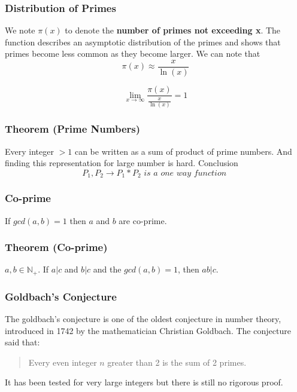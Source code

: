 \documentclass{article}
\begin{document}
\subsubsection{Distribution of Primes} We note $ \pi(x) $ to denote the \textbf{number of primes not exceeding x}. The function describes an asymptotic distribution of the primes and shows that primes become less common as they become larger. We can note that
\begin{equation}
\pi(x) \approx \frac{x}{\ln(x)}
\end{equation}

\begin{tcolorbox}[sharp corners, colback=green!30, colframe=green!80!blue, title=Prime Number Theorem]
\begin{equation}
\lim_{x \rightarrow \infty} \frac{\pi(x)}{\frac{x}{\ln(x)}} = 1
\end{equation}
\end{tcolorbox}

\subsubsection{Theorem (Prime Numbers)} Every integer $ > 1 $ can be written as a sum of product of prime numbers. And finding this representation for large number is hard. Conclusion
\begin{equation}
P_1, P_2 \rightarrow P_1*P_2 \textit{  is a one way function }
\end{equation}

\subsubsection{Co-prime} If $ gcd(a, b) = 1 $ then $ a $ and $ b $ are co-prime.

\subsubsection{Theorem (Co-prime)} $ a, b \in \mathbb{N_+} $. If $ a | c $ and $ b | c $ and the $ gcd(a, b) = 1 $, then $ ab | c $.

\subsubsection{Goldbach's Conjecture} The goldbach's conjecture is one of the oldest conjecture in number theory, introduced in 1742 by the mathematician Christian Goldbach. The conjecture said that:
\begin{quote}
Every even integer $ n $ greater than 2 is the sum of 2 primes.
\end{quote}
It has been tested for very large integers but there is still no rigorous proof.
\end{document}
